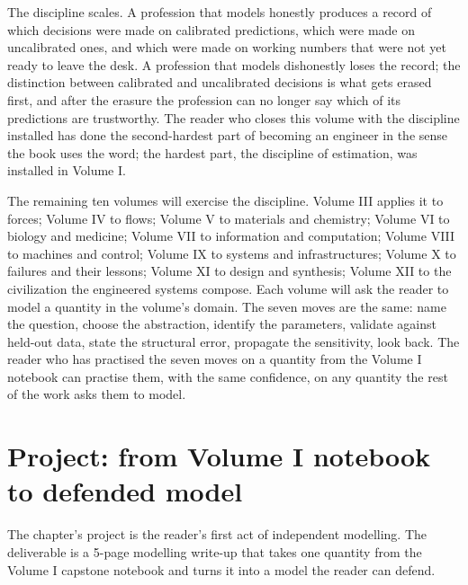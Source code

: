 The discipline scales. A profession that models honestly produces
a record of which decisions were made on calibrated predictions,
which were made on uncalibrated ones, and which were made on
working numbers that were not yet ready to leave the desk. A
profession that models dishonestly loses the record; the
distinction between calibrated and uncalibrated decisions is what
gets erased first, and after the erasure the profession can no
longer say which of its predictions are trustworthy. The reader
who closes this volume with the discipline installed has done
the second-hardest part of becoming an engineer in the sense the
book uses the word; the hardest part, the discipline of
estimation, was installed in Volume I.

The remaining ten volumes will exercise the discipline. Volume III
applies it to forces; Volume IV to flows; Volume V to materials and
chemistry; Volume VI to biology and medicine; Volume VII to
information and computation; Volume VIII to machines and control;
Volume IX to systems and infrastructures; Volume X to failures and
their lessons; Volume XI to design and synthesis; Volume XII to the
civilization the engineered systems compose. Each volume will ask
the reader to model a quantity in the volume's domain. The seven
moves are the same: name the question, choose the abstraction,
identify the parameters, validate against held-out data, state the
structural error, propagate the sensitivity, look back. The reader
who has practised the seven moves on a quantity from the Volume I
notebook can practise them, with the same confidence, on any
quantity the rest of the work asks them to model.

\section{Project: from Volume I notebook to defended model}

The chapter's project is the reader's first act of independent
modelling. The deliverable is a 5-page modelling write-up that
takes one quantity from the Volume I capstone notebook and turns
it into a model the reader can defend.

